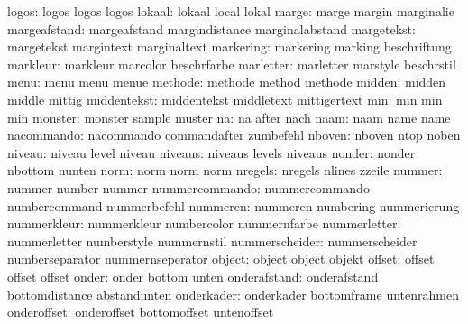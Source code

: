                logos:  logos                logos                logos
              lokaal:  lokaal               local                lokal
               marge:  marge                margin               marginalie
        margeafstand:  margeafstand         margindistance       marginalabstand
          margetekst:  margetekst           margintext           marginaltext
           markering:  markering            marking              beschriftung
            markleur:  markleur             marcolor             beschrfarbe
           marletter:  marletter            marstyle             beschrstil
                menu:  menu                 menu                 menue
             methode:  methode              method               methode
              midden:  midden               middle               mittig
         middentekst:  middentekst          middletext           mittigertext
                 min:  min                  min                  min
             monster:  monster              sample               muster
                  na:  na                   after                nach
                naam:  naam                 name                 name
          nacommando:  nacommando           commandafter         zumbefehl
              nboven:  nboven               ntop                 noben
              niveau:  niveau               level                niveau
             niveaus:  niveaus              levels               niveaus
              nonder:  nonder               nbottom              nunten
                norm:  norm                 norm                 norm
             nregels:  nregels              nlines               zzeile
              nummer:  nummer               number               nummer
      nummercommando:  nummercommando       numbercommand        nummerbefehl
            nummeren:  nummeren             numbering            nummerierung
         nummerkleur:  nummerkleur          numbercolor          nummernfarbe
        nummerletter:  nummerletter         numberstyle          nummernstil
      nummerscheider:  nummerscheider       numberseparator      nummernseperator
              object:  object               object               objekt
              offset:  offset               offset               offset
               onder:  onder                bottom               unten
        onderafstand:  onderafstand         bottomdistance       abstandunten
          onderkader:  onderkader           bottomframe          untenrahmen
         onderoffset:  onderoffset          bottomoffset         untenoffset
